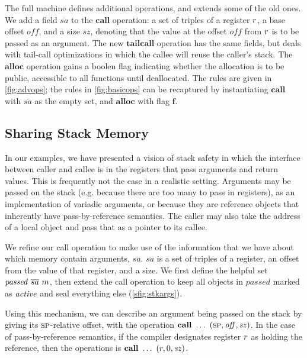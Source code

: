 \documentclass[10pt,conference]{ieeetran}%
\theoremstyle{definition}
\begin{document}
The full machine defines additional operations, and extends some of the old ones.
We add a field \(\overline{sa}\) to the \(\mathbf{call}\) operation: a set of
triples of a register \(r\), a base offset \(\mathit{off}\), and a size \(sz\), denoting
that the value at the offset \(\mathit{off}\) from \(r\) is to be passed as an argument.
The new \(\mathbf{tailcall}\) operation has the same fields, but deals with tail-call
optimizations in which the callee will reuse the caller's stack. The \(\mathbf{alloc}\) operation
gains a boolen flag indicating whether the allocation is to be public, accessible to
all functions until deallocated. The rules are given in \cref{fig:advops}; the
rules in \cref{fig:basicops} can be recaptured by instantiating
\(\mathbf{call}\) with \(\overline{sa}\) as the empty set, and \(\mathbf{alloc}\)
with flag \(\mathbf{f}\).

\subsection{Sharing Stack Memory}
In our examples, we have presented a vision of stack safety in which
the interface between caller and callee is in the registers that pass
arguments and return values. This is frequently not the case in a realistic
setting. Arguments may be passed on the stack (e.g. because there are too many
to pass in registers), as an implementation
of variadic arguments, or because they are reference objects  that inherently have
pass-by-reference semantics. The caller may also take the address of a local object and
pass that as a pointer to its callee.

We refine our call operation to make use of the information that we have about
which memory contain arguments, \(\overline{sa}\). \(\overline{sa}\) is a set of
triples of a register, an offset from the value of that register, and a size.
We first define the helpful set \(\mathit{passed} ~ \overline{sa} ~ m\),
then extend the call operation to keep all objects in \(\mathit{passed}\) marked
as \(\mathit{active}\) and seal everything else (\cref{sfig:stkargs}).

Using this mechanism, we can describe an argument being passed on the stack
by giving its \(\textsc{sp}\)-relative offset,
with the operation \(\mathbf{call} ~ \dots ~ (\textsc{sp}, \mathit{off}, \mathit{sz})\).
In the case of pass-by-reference semantics, if the compiler designates register
\(r\) as holding the reference, then the operations is
\(\mathbf{call} ~ \dots ~ (r, 0, \mathit{sz})\).
\end{document}
